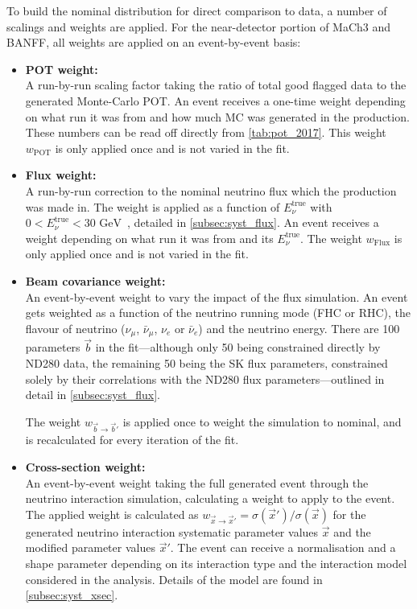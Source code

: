 To build the nominal distribution for direct comparison to data, a number of scalings and weights are applied. For the near-detector portion of MaCh3 and BANFF, all weights are applied on an event-by-event basis:
\begin{itemize}
	\item \textbf{POT weight:} \\
	A run-by-run scaling factor taking the ratio of total good flagged data to the generated Monte-Carlo POT. An event receives a one-time weight depending on what run it was from and how much MC was generated in the production. These numbers can be read off directly from \autoref{tab:pot_2017}. This weight $w_\text{POT}$ is only applied once and is not varied in the fit.
	
	\item \textbf{Flux weight:} \\
	A run-by-run correction to the nominal neutrino flux which the production was made in. The weight is applied as a function of $E_\nu^{\text{true}}$ with~$0 < E_\nu^{\text{true}} < 30 \text{ GeV}$~, detailed in \autoref{subsec:syst_flux}. An event receives a weight depending on what run it was from and its $E_\nu^{\text{true}}$. The weight $w_\text{Flux}$ is only applied once and is not varied in the fit.
	
	\item \textbf{Beam covariance weight:} \\
	An event-by-event weight to vary the impact of the flux simulation. An event gets weighted as a function of the neutrino running mode (FHC or RHC), the flavour of neutrino ($\nu_\mu$, $\bar{\nu}_\mu$, $\nu_e$ or $\bar{\nu}_e$) and the neutrino energy. There are 100 parameters $\vec{b}$ in the fit---although only 50 being constrained directly by ND280 data, the remaining 50 being the SK flux parameters, constrained solely by their correlations with the ND280 flux parameters---outlined in detail in \autoref{subsec:syst_flux}.
	
	The weight $w_{\vec{b}\rightarrow \vec{b}'}$ is applied once to weight the simulation to nominal, and is recalculated for every iteration of the fit.
	
	\item \textbf{Cross-section weight:} \\
	An event-by-event weight taking the full generated event through the neutrino interaction simulation, calculating a weight to apply to the event. The applied weight is calculated as $w_{\vec{x} \rightarrow \vec{x}'}=\sigma(\vec{x}')/\sigma(\vec{x})$ for the generated neutrino interaction systematic parameter values $\vec{x}$ and the modified parameter values $\vec{x}'$. The event can receive a normalisation and a shape parameter depending on its interaction type and the interaction model considered in the analysis. Details of the model are found in \autoref{subsec:syst_xsec}.
	

\end{itemize}
